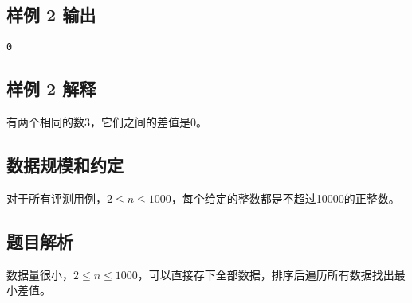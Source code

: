 \subsection{样例 2 输出}

\begin{lstlisting}[numbers=none]
0
\end{lstlisting}

\subsection{样例 2 解释}

有两个相同的数3，它们之间的差值是0。

\subsection{数据规模和约定}

对于所有评测用例，$2\leq n\leq1000$，每个给定的整数都是不超过10000的正整数。

\subsection{题目解析}

数据量很小，$2\leq n\leq 1000$，可以直接存下全部数据，排序后遍历所有数据找出最小差值。

